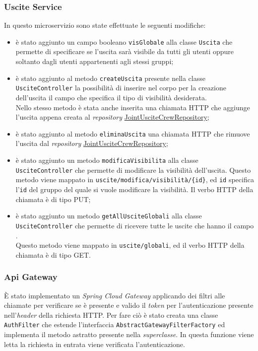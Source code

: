 \subsubsection{Uscite Service}
In questo \gls{microservizio} sono state effettuate le seguenti modifiche: 
\begin{itemize}
    \item è stato aggiunto un campo booleano \texttt{visGlobale} alla classe \texttt{Uscita} che permette di specificare se l'uscita sarà visibile da tutti gli utenti oppure soltanto dagli utenti appartenenti agli stessi gruppi;
    \item è stato aggiunto al metodo \texttt{createUscita} presente nella classe \texttt{UsciteController} la possibilità di inserire nel corpo per la creazione dell'uscita il campo che specifica il tipo di visibilità desiderata. \\
    Nello stesso metodo è stata anche inserita una chiamata HTTP che aggiunge l'uscita appena creata al \textit{repository} \hyperref[JointUsciteCrewRepository]{JointUsciteCrewRepository};
    \item è stato aggiunto al metodo \texttt{eliminaUscita} una chiamata HTTP che rimuove l'uscita dal \textit{repository} \hyperref[JointUsciteCrewRepository]{JointUsciteCrewRepository};
    \item è stato aggiunto un metodo \texttt{modificaVisibilita}  alla classe \texttt{UsciteController} che permette di modificare la visibilità dell'uscita.
    Questo metodo viene mappato in \texttt{uscite/modifica/visibilità/\{id\}}, ed \texttt{id} specifica l'\texttt{id} del gruppo del quale si vuole modificare la visibilità. Il verbo HTTP della chiamata è di tipo PUT; 
    \item è stato aggiunto un metodo \texttt{getAllUsciteGlobali}  alla classe \texttt{UsciteController} che permette di ricevere tutte le uscite che hanno il campo . \\
    Questo metodo viene mappato in \texttt{uscite/globali}, ed il verbo HTTP della chiamata è di tipo GET.
\end{itemize}


\subsubsection{Api Gateway}
È stato implementato un \textit{Spring Cloud Gateway} applicando dei filtri alle chiamate per verificare se è presente e valido il \textit{token} per l'autenticazione  presente nell'\textit{header} della richiesta HTTP.
Per fare ciò è stato creata una classe \texttt{AuthFilter} che estende l'interfaccia \texttt{AbstractGatewayFilterFactory} ed implementa il metodo astratto  presente nella \textit{superclasse}. In questa funzione viene letta la richiesta in entrata viene verificata l'autenticazione.

